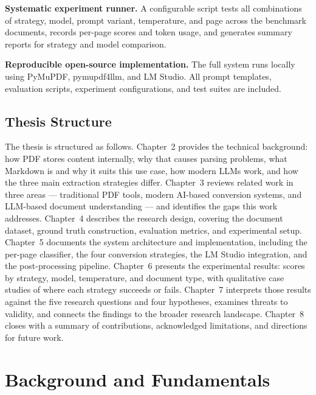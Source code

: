 \documentclass[12pt]{article}
\begin{document}
\textbf{Systematic experiment runner.} A configurable script tests all
combinations of strategy, model, prompt variant, temperature, and page
across the benchmark documents, records per-page scores and token usage, and
generates summary reports for strategy and model comparison.

\textbf{Reproducible open-source implementation.} The full system runs
locally using PyMuPDF, pymupdf4llm, and LM Studio. All prompt templates,
evaluation scripts, experiment configurations, and test suites are included.

\subsection{Thesis Structure}

The thesis is structured as follows. Chapter~2 provides the technical background: how PDF stores content internally, why that causes parsing problems, what Markdown is and why it suits this use case, how modern LLMs work, and how the three main extraction strategies differ. Chapter~3 reviews related work in three areas — traditional PDF tools, modern AI-based conversion systems, and LLM-based document understanding — and identifies the gaps this work addresses. Chapter~4 describes the research design, covering the document dataset, ground truth construction, evaluation metrics, and experimental setup. Chapter~5 documents the system architecture and implementation, including the per-page classifier, the four conversion strategies, the LM Studio integration, and the post-processing pipeline. Chapter~6 presents the experimental results: scores by strategy, model, temperature, and document type, with qualitative case studies of where each strategy succeeds or fails. Chapter~7 interprets those results against the five research questions and four hypotheses, examines threats to validity, and connects the findings to the broader research landscape. Chapter~8 closes with a summary of contributions, acknowledged limitations, and directions for future work.


\section{Background and Fundamentals}
\end{document}
